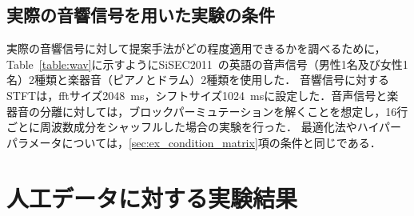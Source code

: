 \subsection{実際の音響信号を用いた実験の条件}
\label{sec:ex_condition_audio}
実際の音響信号に対して提案手法がどの程度適用できるかを調べるために，Table~\ref{table:wav}に示すようにSiSEC2011~\cite{Sisec}の英語の音声信号（男性1名及び女性1名）2種類と楽器音（ピアノとドラム）2種類を使用した．
音響信号に対するSTFTは，fftサイズ2048~ms，シフトサイズ1024~msに設定した．音声信号と楽器音の分離に対しては，ブロックパーミュテーションを解くことを想定し，16行ごとに周波数成分をシャッフルした場合の実験を行った．
最適化法やハイパーパラメータについては，\ref{sec:ex_condition_matrix}項の条件と同じである．
\section{人工データに対する実験結果}
\label{sec:ex_res}


